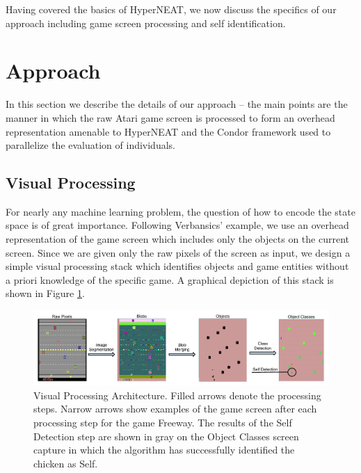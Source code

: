 \documentclass{acm_proc_article-sp}
\begin{document}
Having covered the basics of HyperNEAT, we now discuss the specifics of our approach including game screen processing and self identification.


\section{Approach}
\label{sec:approach}
In this section we describe the details of our approach -- the main points are the manner in which the raw Atari game screen is processed to form an overhead representation amenable to HyperNEAT and the Condor framework used to parallelize the evaluation of individuals.

\subsection{Visual Processing}

For nearly any machine learning problem, the question of how to encode the state space is of great importance. Following Verbansics' example, we use an overhead representation of the game screen which includes only the objects on the current screen. Since we are given only the raw pixels of the screen as input, we design a simple visual processing stack which identifies objects and game entities without a priori knowledge of the specific game. A graphical depiction of this stack is shown in Figure \ref{fig:visproc}.

\begin{figure}[htp]
\begin{center}
\includegraphics[width=\textwidth]{figures/AtariArch}
\end{center}
\caption{Visual Processing Architecture. Filled arrows denote the processing steps. Narrow arrows show examples of the game screen after each processing step for the game Freeway. The results of the Self Detection step are shown in gray on the Object Classes screen capture in which the algorithm has successfully identified the chicken as Self.}
\label{fig:visproc}
\end{figure}
\end{document}
